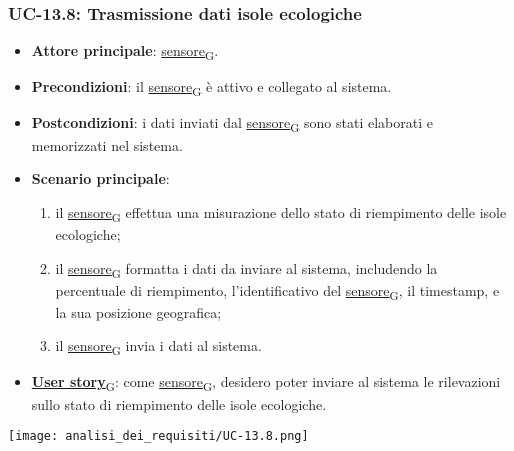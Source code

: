 \subsubsection{UC-13.8: Trasmissione dati isole ecologiche}
\begin{itemize}
	\item \textbf{Attore principale}: \href{https://7last.github.io/docs/pb/documentazione-interna/glossario\#sensore}{sensore\textsubscript{G}}.
	\item \textbf{Precondizioni}: il \href{https://7last.github.io/docs/pb/documentazione-interna/glossario\#sensore}{sensore\textsubscript{G}} è attivo e collegato al sistema.
	\item \textbf{Postcondizioni}: i dati inviati dal \href{https://7last.github.io/docs/pb/documentazione-interna/glossario\#sensore}{sensore\textsubscript{G}} sono stati elaborati e memorizzati nel sistema.
	\item \textbf{Scenario principale}:
	      \begin{enumerate}
		      \item il \href{https://7last.github.io/docs/pb/documentazione-interna/glossario\#sensore}{sensore\textsubscript{G}} effettua una misurazione dello stato di riempimento delle isole ecologiche;
		      \item il \href{https://7last.github.io/docs/pb/documentazione-interna/glossario\#sensore}{sensore\textsubscript{G}} formatta i dati da inviare al sistema, includendo la percentuale di riempimento, l'identificativo del \href{https://7last.github.io/docs/pb/documentazione-interna/glossario\#sensore}{sensore\textsubscript{G}},
		            il timestamp, e la sua posizione geografica;
		      \item il \href{https://7last.github.io/docs/pb/documentazione-interna/glossario\#sensore}{sensore\textsubscript{G}} invia i dati al sistema.
	      \end{enumerate}
	\item \href{https://7last.github.io/docs/pb/documentazione-interna/glossario\#user-story}{\textbf{User story}\textsubscript{G}}: come \href{https://7last.github.io/docs/pb/documentazione-interna/glossario\#sensore}{sensore\textsubscript{G}}, desidero poter inviare al sistema le rilevazioni sullo stato di riempimento delle isole ecologiche.
\end{itemize}

\begin{center}
	\texttt{[image: analisi\_dei\_requisiti/UC-13.8.png]}
\end{center}

